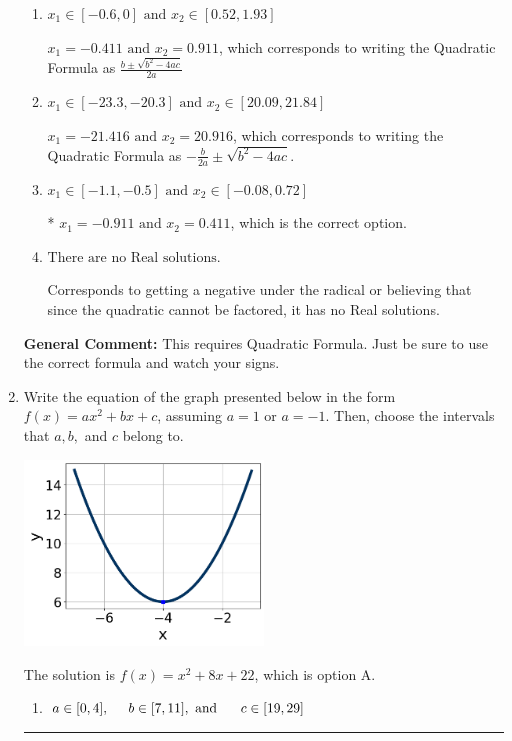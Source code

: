 \documentclass{extbook}[14pt]
\newcommand{\litem}[1]{\item #1

\rule{\textwidth}{0.4pt}}
\begin{document}
\begin{enumerate}
{\begin{enumerate}[label=\Alph*.]
 $x_1 = -6.583 \text{ and } x_2 = 14.583$, which corresponds to using the Quadratic Formula with $a=1$
\item \( x_1 \in [-0.6, 0] \text{ and } x_2 \in [0.52, 1.93] \)

 $x_1 = -0.411 \text{ and } x_2 = 0.911$, which corresponds to writing the Quadratic Formula as $\frac{b \pm \sqrt{b^2 - 4ac}}{2a}$
\item \( x_1 \in [-23.3, -20.3] \text{ and } x_2 \in [20.09, 21.84] \)

 $x_1 = -21.416 \text{ and } x_2 = 20.916$, which corresponds to writing the Quadratic Formula as $-\frac{b}{2a} \pm \sqrt{b^2 - 4ac}$.
\item \( x_1 \in [-1.1, -0.5] \text{ and } x_2 \in [-0.08, 0.72] \)

* $x_1 = -0.911 \text{ and } x_2 = 0.411$, which is the correct option.
\item \( \text{There are no Real solutions.} \)

Corresponds to getting a negative under the radical or believing that since the quadratic cannot be factored, it has no Real solutions.
\end{enumerate}

\textbf{General Comment:} This requires Quadratic Formula. Just be sure to use the correct formula and watch your signs.
}
\litem{
Write the equation of the graph presented below in the form $f(x)=ax^2+bx+c$, assuming  $a=1$ or $a=-1$. Then, choose the intervals that $a, b,$ and $c$ belong to.

\begin{center}
    \includegraphics[width=0.5\textwidth]{../Figures/quadraticGraphToEquationC.png}
\end{center}



The solution is \( f(x) = x^{2} +8 x + 22 \), which is option A.\begin{enumerate}[label=\Alph*.]
\item \( a \in [0, 4], \hspace*{5mm} b \in [7, 11], \text{ and } \hspace*{5mm} c \in [19, 29] \)


\end{enumerate}}
\end{enumerate}
\end{document}
